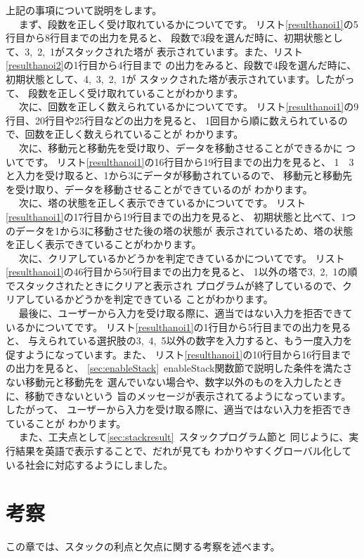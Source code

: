 \documentclass[a4j]{jarticle}
\begin{document}
上記の事項について説明をします。
\\~~
まず、段数を正しく受け取れているかについてです。
リスト\ref{resulthanoi1}の5行目から8行目までの出力を見ると、
段数で3段を選んだ時に、初期状態として、3,~2,~1がスタックされた塔が
表示されています。また、リスト\ref{resulthanoi2}の1行目から4行目まで
の出力をみると、段数で4段を選んだ時に、初期状態として、4,~3,~2,~1が
スタックされた塔が表示されています。したがって、
段数を正しく受け取れていることがわかります。
\\~~
次に、回数を正しく数えられているかについてです。
リスト\ref{resulthanoi1}の9行目、20行目や25行目などの出力を見ると、
1回目から順に数えられているので、回数を正しく数えられていることが
わかります。
\\~~
次に、移動元と移動先を受け取り、データを移動させることができるかに
ついてです。
リスト\ref{resulthanoi1}の16行目から19行目までの出力を見ると、
1~~3と入力を受け取ると、1から3にデータが移動されているので、
移動元と移動先を受け取り、データを移動させることができているのが
わかります。
\\~~
次に、塔の状態を正しく表示できているかについてです。
リスト\ref{resulthanoi1}の17行目から19行目までの出力を見ると、
初期状態と比べて、1つのデータを1から3に移動させた後の塔の状態が
表示されているため、塔の状態を正しく表示できていることがわかります。
\\~~
次に、クリアしているかどうかを判定できているかについてです。
リスト\ref{resulthanoi1}の46行目から50行目までの出力を見ると、
1以外の塔で3,~2,~1の順でスタックされたときにクリアと表示され
プログラムが終了しているので、クリアしているかどうかを判定できている
ことがわかります。
\\~~
最後に、ユーザーから入力を受け取る際に、適当ではない入力を拒否できて
いるかについてです。
リスト\ref{resulthanoi1}の1行目から5行目までの出力を見ると、
与えられている選択肢の3,~4,~5以外の数字を入力すると、もう一度入力を
促すようになっています。また、
リスト\ref{resulthanoi1}の10行目から16行目までの出力を見ると、
\ref{sec:enableStack}~enableStack関数節で説明した条件を満たさない移動元と移動先を
選んでいない場合や、数字以外のものを入力したときに、移動できないという
旨のメッセージが表示されてるようになっています。したがって、
ユーザーから入力を受け取る際に、適当ではない入力を拒否できていることが
わかります。
\\~~
また、工夫点として\ref{sec:stackresult}~スタックプログラム節と
同じように、実行結果を英語で表示することで、だれが見ても
わかりやすくグローバル化している社会に対応するようにしました。

\section{考察}
この章では、スタックの利点と欠点に関する考察を述べます。
\end{document}

